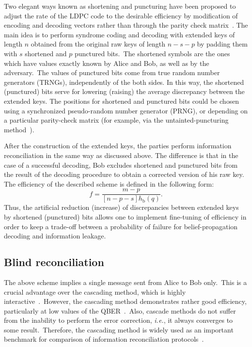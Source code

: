 \documentclass[aps,pra,twocolumn,amsmath,amssymb,nofootinbib,showpacs,superscriptaddress]{revtex4-1}
\newcommand{\hb}{h_\mathrm{b}}
\begin{document}
Two elegant ways known as shortening and puncturing have been proposed to adjust the rate of the LDPC code to the desirable efficiency by modification of encoding and decoding vectors rather than through the parity check matrix~\cite{LDPC4_adapt1,LDPC4_adapt2}.
The main idea is to perform syndrome coding and decoding with extended keys of length $n$ obtained from the original raw keys of length $n-s-p$ by padding them with $s$ shortened and $p$ punctured bits.~The shortened symbols are the ones which have values exactly known by Alice and Bob, as well as by the adversary.~The values of punctured bits come from true random number generators (TRNGs), independently of the both sides. 
In this way, the shortened (punctured) bits serve for lowering (raising) the average discrepancy between the extended keys.
The positions for shortened and punctured bits could be chosen using a synchronized pseudo-random number generator (PRNG), or depending on a particular parity-check matrix (for example, via the untainted-puncturing method~\cite{UntP}).

After the construction of the extended keys, the parties perform information reconciliation in the same way as discussed above.
The difference is that in the case of a successful decoding, Bob excludes shortened and punctured bits from the result of the decoding procedure to obtain a corrected version of his raw key.
The efficiency of the described scheme is defined in the following form:
\begin{equation} \label{eq:fad}
	f = \frac{m-p}{\left[n-p-s\right]\hb(q)}.
\end{equation}
Thus, the artificial reduction (increase) of discrepancies between extended keys by shortened (punctured) 
bits allows one to implement fine-tuning of efficiency in order to keep a trade-off between a probability of failure for belief-propagation decoding and information leakage.

\subsection{Blind reconciliation}

The above scheme implies a single message sent from Alice to Bob only.~This is a crucial advantage over the cascading method, which is highly interactive~\cite{Cascade2_rev}.~However, the cascading method demonstrates rather good efficiency, particularly at low values of the QBER~\cite{Cascade2_rev,LDPC2_poly}.~Also, cascade methods do not suffer from the inability to perform the error correction, {\it i.e.}, it always converges to some result.~Therefore, the cascading method is widely used as an important benchmark for comparison of information reconciliation protocols~\cite{LDPC6_blindrep}.
\end{document}
